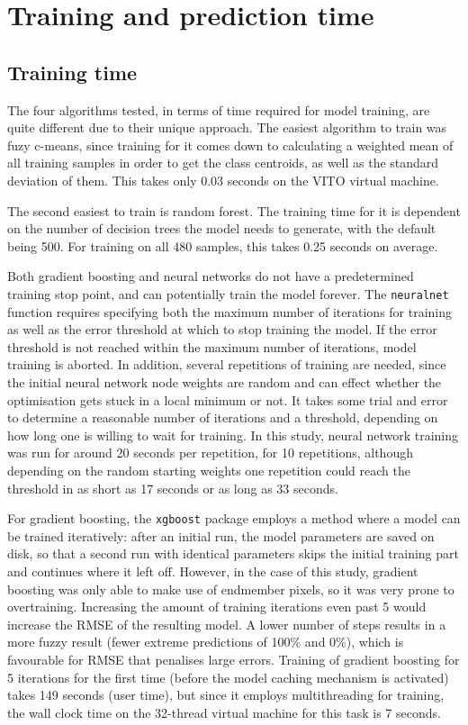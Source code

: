 \documentclass[a4paper,10pt]{book}
\begin{document}
\section{Training and prediction time}

\subsection{Training time}

The four algorithms tested, in terms of time required for model training, are quite different due to their unique approach. The easiest algorithm to train was fuzy c-means, since training for it comes down to calculating a weighted mean of all training samples in order to get the class centroids, as well as the standard deviation of them. This takes only 0.03 seconds on the VITO virtual machine.

The second easiest to train is random forest. The training time for it is dependent on the number of decision trees the model needs to generate, with the default being 500. For training on all 480 samples, this takes 0.25 seconds on average.

Both gradient boosting and neural networks do not have a predetermined training stop point, and can potentially train the model forever. The \texttt{neuralnet} function requires specifying both the maximum number of iterations for training as well as the error threshold at which to stop training the model. If the error threshold is not reached within the maximum number of iterations, model training is aborted. In addition, several repetitions of training are needed, since the initial neural network node weights are random and can effect whether the optimisation gets stuck in a local minimum or not. It takes some trial and error to determine a reasonable number of iterations and a threshold, depending on how long one is willing to wait for training. In this study, neural network training was run for around 20 seconds per repetition, for 10 repetitions, although depending on the random starting weights one repetition could reach the threshold in as short as 17 seconds or as long as 33 seconds.

For gradient boosting, the \texttt{xgboost} package employs a method where a model can be trained iteratively: after an initial run, the model parameters are saved on disk, so that a second run with identical parameters skips the initial training part and continues where it left off. However, in the case of this study, gradient boosting was only able to make use of endmember pixels, so it was very prone to overtraining. Increasing the amount of training iterations even past 5 would increase the RMSE of the resulting model. A lower number of steps results in a more fuzzy result (fewer extreme predictions of 100\% and 0\%), which is favourable for RMSE that penalises large errors. Training of gradient boosting for 5 iterations for the first time (before the model caching mechanism is activated) takes 149 seconds (user time), but since it employs multithreading for training, the wall clock time on the 32-thread virtual machine for this task is 7 seconds.
\end{document}
